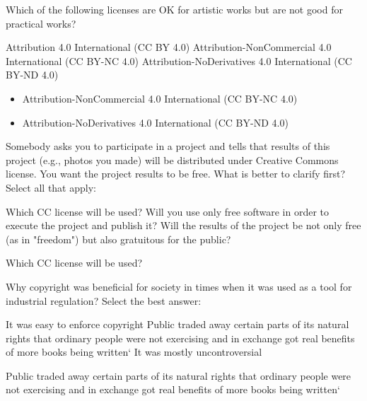 \begin{question}[type=exam]
Which of the following licenses are OK for artistic works but are not good for practical works?
\begin{itemize}
\chk Attribution 4.0 International (CC BY 4.0)
\chk Attribution-NonCommercial 4.0 International (CC BY-NC 4.0)
\chk Attribution-NoDerivatives 4.0 International (CC BY-ND 4.0)
\end{itemize}
\end{question}
\begin{solution}
\begin{itemize}
\item Attribution-NonCommercial 4.0 International (CC BY-NC 4.0)
\item Attribution-NoDerivatives 4.0 International (CC BY-ND 4.0)
\end{itemize}
\end{solution}


\begin{question}[type=exam]
Somebody asks you to participate in a project and tells that results of this project (e.g., photos you made) will be distributed under Creative Commons license. You want the project results to be free. What is better to clarify first? Select all that apply:
\begin{itemize}
\chk Which CC license will be used?
\chk Will you use only free software in order to execute the project and publish it?
\chk Will the results of the project be not only free (as in "freedom") but also gratuitous for the public?
\end{itemize}
\end{question}
\begin{solution}
Which CC license will be used?
\end{solution}


\begin{question}[type=exam]
Why copyright was beneficial for society in times when it was used as a tool for industrial regulation? Select the best answer:
\begin{itemize}
\chk It was easy to enforce copyright
\chk Public traded away certain parts of its natural rights that ordinary people were not exercising and in exchange got real benefits of more books being written`
\chk It was mostly uncontroversial
\end{itemize}
\end{question}
\begin{solution}
Public traded away certain parts of its natural rights that ordinary people were not exercising and in exchange got real benefits of more books being written`
\end{solution}



